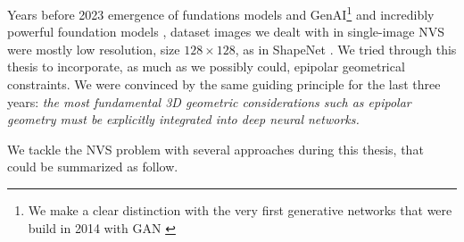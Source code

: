 Years before 2023 emergence of fundations models and \ac{GenAI}\footnote{We make a clear distinction with the very first generative networks that were build in 2014 with \ac{GAN} \citep{goodfellow2014generative}} and incredibly powerful foundation models \citep{awais2023foundational}, dataset images we dealt with in single-image \ac{NVS} were mostly low resolution, size $128\times128$, as in ShapeNet \citep{chang2015shapenet}. We tried through this thesis to incorporate, as much as we possibly could, epipolar geometrical constraints. We were convinced by the same guiding principle for the last three years: \textit{the most fundamental 3D geometric considerations such as epipolar geometry must be explicitly integrated into deep neural networks.}

We tackle the \ac{NVS} problem with several approaches during this thesis, that could be summarized as follow.
